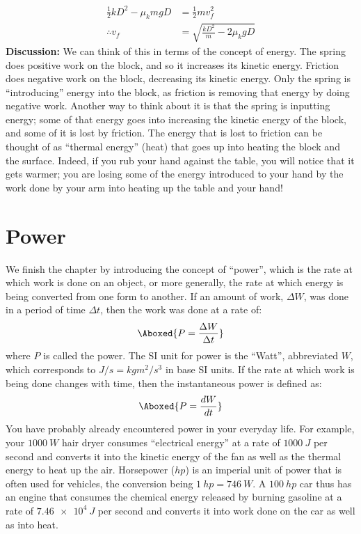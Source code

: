\begin{example}
\begin{align*}
\frac{1}{2}kD^2-\mu_kmgD  &=\frac{1}{2}mv_f^2\\
\therefore v_f &=\sqrt{\frac{kD^2}{m}-2\mu_kgD}
\end{align*}
\textbf{Discussion:} We can think of this in terms of the concept of energy. The spring does positive work on the block, and so it increases its kinetic energy. Friction does negative work on the block, decreasing its kinetic energy. Only the spring is ``introducing'' energy into the block, as friction is removing that energy by doing negative work. Another way to think about it is that the spring is inputting energy; some of that energy goes into increasing the kinetic energy of the block, and some of it is lost by friction. The energy that is lost to friction can be thought of as ``thermal energy'' (heat) that goes up into heating the block and the surface. Indeed, if you rub your hand against the table, you will notice that it gets warmer; you are losing some of the energy introduced to your hand by the work done by your arm into heating up the table and your hand! 
\end{example}

\section{Power}
We finish the chapter by introducing the concept of ``power'', which is the rate at which work is done on an object, or more generally, the rate at which energy is being converted from one form to another. If an amount of work, $\Delta W$, was done in a period of time $\Delta t$, then the work was done at a rate of:
\begin{align}
\Aboxed{P = \frac{\Delta W}{\Delta t}}
\end{align}
where $P$ is called the power. The SI unit for power is the ``Watt'', abbreviated $\si{W}$, which corresponds to $\si{J/s}=\si{kg m^2/s^3}$ in base SI units. If the rate at which work is being done changes with time, then the instantaneous power is defined as:
\begin{align}
\Aboxed{P = \frac{dW}{dt}}
\end{align}
You have probably already encountered power in your everyday life. For example, your $\SI{1000}{W}$ hair dryer consumes ``electrical energy'' at a rate of $\SI{1000}{J}$ per second and converts it into the kinetic energy of the fan as well as the thermal energy to heat up the air. Horsepower ($\si{hp}$) is an imperial unit of power that is often used for vehicles, the conversion being $\SI{1}{hp} = \SI{746}{W}$. A $\SI{100}{hp}$ car thus has an engine that consumes the chemical energy released by burning gasoline at a rate of $\SI{7.46e4}{J}$ per second and converts it into work done on the car as well as into heat. 

